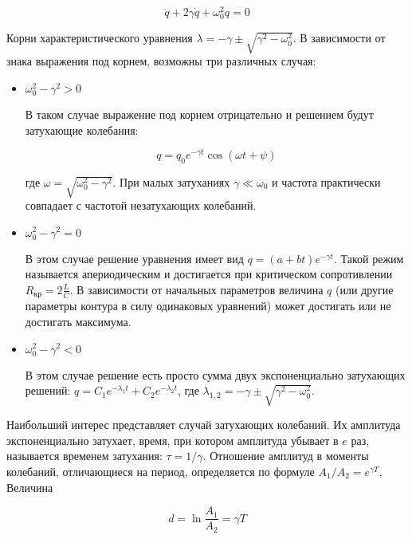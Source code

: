 \begin{equation}
    \ddot q + 2 \gamma \dot q + \omega_0^2 q = 0
\end{equation}

Корни характеристического уравнения $\lambda = - \gamma \pm \sqrt{\gamma^2 - \omega_0^2}$. В зависимости от знака выражения под корнем, возможны три различных случая:

\begin{itemize}
    \item $\omega_0^2 - \gamma^2 > 0$

    В таком случае выражение под корнем отрицательно и решением будут затухающие колебания:

    \begin{equation}
        q = q_0 e^{- \gamma t} \cos \left( \omega t + \psi \right)
    \end{equation}

    \noindent
    где $\omega = \sqrt{\omega_0^2 - \gamma^2}$. При малых затуханиях $\gamma \ll \omega_0$ и частота практически совпадает с частотой незатухающих колебаний.

    \item $\omega_0^2 - \gamma^2 = 0$

    В этом случае решение уравнения имеет вид $q = (a + b t) e^{- \gamma t}$. Такой режим называется апериодическим и достигается при критическом сопротивлении $R_\text{кр} = 2 \frac{L}{C}$. В зависимости от начальных параметров величина $q$ (или другие параметры контура в силу одинаковых уравнений) может достигать или не достигать максимума.

    \item $\omega_0^2 - \gamma^2 < 0$

    В этом случае решение есть просто сумма двух экспоненциально затухающих решений: $q = C_1 e^{- \lambda_1 t} + C_2 e^{- \lambda_2 t}$, где $\lambda_{1, 2} = - \gamma \pm \sqrt{\gamma^2 - \omega_0^2}$.
\end{itemize}

Наибольший интерес представляет случай затухающих колебаний. Их амплитуда экспоненциально затухает, время, при котором амплитуда убывает в $e$ раз, называется временем затухания: $\tau = 1 / \gamma$. Отношение амплитуд в моменты колебаний, отличающиеся на период, определяется по формуле $A_1 / A_2 = e^{\gamma T}$. Величина

\begin{equation}
    d = \ln \frac{A_1}{A_2} = \gamma T
\end{equation}

